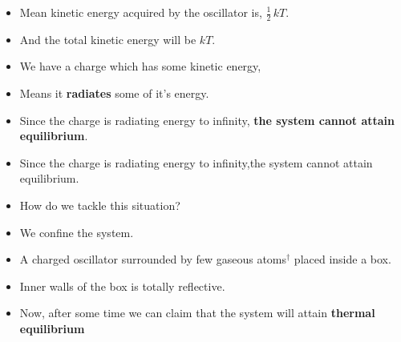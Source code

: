 \documentclass[aspectratio=169]{beamer}
\newcommand{\highlight}[1]{\textbf{#1}}
\begin{document}
\begin{frame}
	
	\begin{itemize}
	
		\item Mean kinetic energy acquired by the oscillator is, $\frac{1}{2}\,kT$. \newline
		\item And the total kinetic energy will be $ kT $. 
		
		\end{itemize}
		
\end{frame}


\begin{frame}
	\begin{itemize}

		\item We have a charge which has some kinetic energy, \pause \newline
		\item Means it \highlight{radiates} some of it's energy. \newline 
		\item Since the charge is radiating energy to infinity, \highlight{the system cannot attain equilibrium}.
			
	\end{itemize}
\end{frame}

	
\begin{frame}
	\begin{itemize}
			
		\item Since the charge is radiating energy to infinity,the system cannot attain equilibrium. \newline
		\item How do we tackle this situation? \pause \newline
		\item We confine the system.
		
	\end{itemize}
	
\end{frame}
	
		
\begin{frame}

	\begin{itemize}
			
		\item A charged oscillator surrounded by few gaseous atoms$^\dag$ placed inside a box. \newline
		\item Inner walls of the box is totally reflective.\newline
		\item Now, after some time we can claim that the system will attain \highlight{thermal equilibrium}
	\end{itemize}
	
\end{frame}
		
\end{document}
